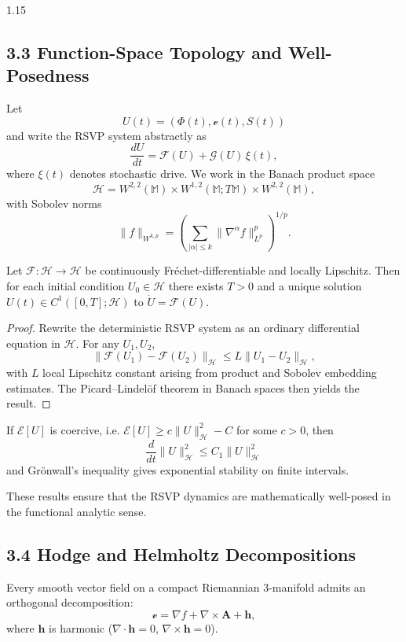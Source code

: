 \documentclass[12pt,a4paper]{article}
\begin{document}
\begin{spacing}{1.15}
\subsection{3.3 Function-Space Topology and Well-Posedness}

Let
\[
U(t) = (\Phi(t),\boldsymbol{\mathcal v}(t),S(t))
\]
and write the RSVP system abstractly as
\[
\frac{dU}{dt} = \mathcal{F}(U) + \mathcal{G}(U)\,\xi(t),
\]
where $\xi(t)$ denotes stochastic drive.
We work in the Banach product space
\[
\mathcal{H} = W^{2,2}(\mathbb{M}) \times W^{1,2}(\mathbb{M};T\mathbb{M}) \times W^{2,2}(\mathbb{M}),
\]
with Sobolev norms
\[
\|f\|_{W^{k,p}}
 = \left( \sum_{|\alpha|\le k} \|\nabla^\alpha f\|_{L^p}^p \right)^{1/p}.
\]

\begin{theorem}
Let $\mathcal{F}:\mathcal{H}\to\mathcal{H}$ be continuously Fréchet-differentiable and locally Lipschitz.  
Then for each initial condition $U_0\in\mathcal{H}$ there exists $T>0$ and a unique solution $U(t)\in C^1([0,T];\mathcal{H})$ to
$\dot U = \mathcal{F}(U)$.
\end{theorem}

\begin{proof}
Rewrite the deterministic RSVP system as an ordinary differential equation in $\mathcal{H}$.  
For any $U_1,U_2$,
\[
\|\mathcal{F}(U_1)-\mathcal{F}(U_2)\|_{\mathcal{H}}
\le L\|U_1-U_2\|_{\mathcal{H}},
\]
with $L$ local Lipschitz constant arising from product and Sobolev embedding estimates.
The Picard–Lindelöf theorem in Banach spaces then yields the result.
\end{proof}

\begin{lemma}
If $\mathcal{E}[U]$ is coercive, i.e.
$\mathcal{E}[U] \ge c\|U\|_{\mathcal{H}}^2 - C$
for some $c>0$, then
\[
\frac{d}{dt}\|U\|_{\mathcal{H}}^2 \le C_1\|U\|_{\mathcal{H}}^2
\]
and Grönwall’s inequality gives exponential stability on finite intervals.
\end{lemma}

These results ensure that the RSVP dynamics are mathematically well-posed in the functional analytic sense.

\subsection{3.4 Hodge and Helmholtz Decompositions}

Every smooth vector field on a compact Riemannian $3$-manifold admits an orthogonal decomposition:
\[
\boldsymbol{\mathcal v} =
 \nabla f + \nabla\times \mathbf{A} + \mathbf{h},
\]
where $\mathbf{h}$ is harmonic ($\nabla\cdot\mathbf{h}=0$, $\nabla\times\mathbf{h}=0$).


\end{spacing}
\end{document}
